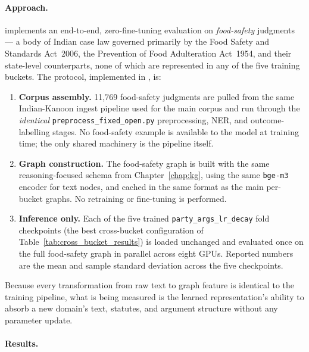 \paragraph{Approach.}
 implements an
end-to-end, zero-fine-tuning evaluation on \emph{food-safety}
judgments --- a body of Indian case law governed primarily by the
Food Safety and Standards Act~2006, the Prevention of Food
Adulteration Act~1954, and their state-level counterparts, none of
which are represented in any of the five training buckets.  The
protocol, implemented in , is:

\begin{enumerate}
  \item \textbf{Corpus assembly.}  11{,}769 food-safety judgments are
    pulled from the same Indian-Kanoon ingest pipeline used for the
    main corpus and run through the \emph{identical}
    \texttt{preprocess\_fixed\_open.py} preprocessing, NER, and
    outcome-labelling stages.  No food-safety example is available
    to the model at training time; the only shared machinery is the
    pipeline itself.
  \item \textbf{Graph construction.}  The food-safety graph is built
    with the same reasoning-focused schema from
    Chapter~\ref{chap:kg}, using the same \texttt{bge-m3} encoder
    for text nodes, and cached in the same format as the main
    per-bucket graphs.  No retraining or fine-tuning is performed.
  \item \textbf{Inference only.}  Each of the five trained
    \texttt{party\_args\_lr\_decay} fold checkpoints (the best
    cross-bucket configuration of
    Table~\ref{tab:cross_bucket_results}) is loaded unchanged and
    evaluated once on the full food-safety graph in parallel across
    eight GPUs.  Reported numbers are the mean and sample standard
    deviation across the five checkpoints.
\end{enumerate}

Because every transformation from raw text to graph feature is
identical to the training pipeline, what is being measured is the
learned representation's ability to absorb a new domain's text,
statutes, and argument structure without any parameter update.

\paragraph{Results.}

